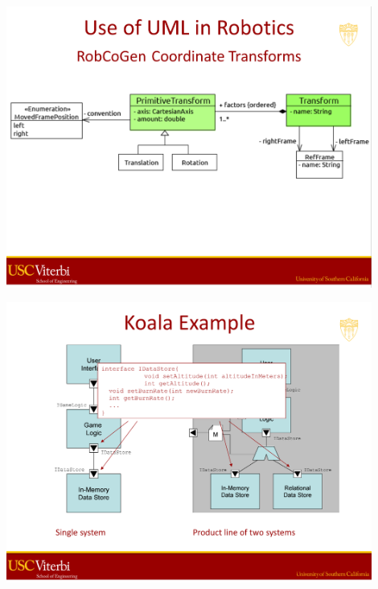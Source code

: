 \documentclass[xetex,mathserif,serif]{beamer}
\begin{document}
	\begin{frame}
		\begin{center}
			\includegraphics[width=0.9\textwidth]{medvidovic9.png}
		\end{center}
	\end{frame}

	\begin{frame}
		\begin{center}
			\includegraphics[width=0.9\textwidth]{medvidovic10.png}
		\end{center}
	\end{frame}
\end{document}
